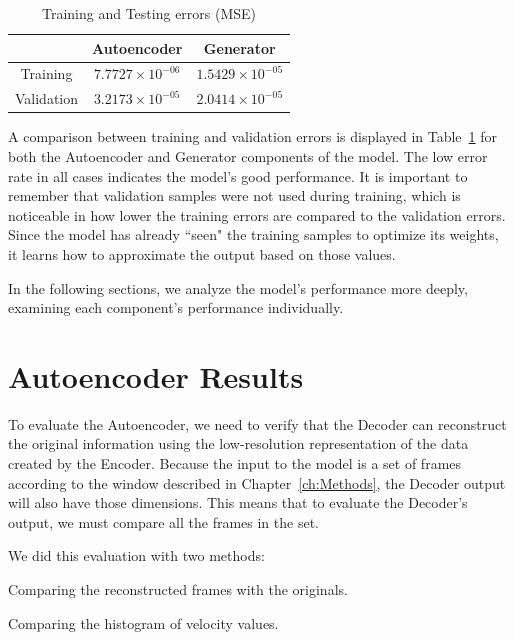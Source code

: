 \begin{table}[h]
    \caption{Training and Testing errors (MSE)}
    \centering
    \begin{tabular}{|c|c|c|}
    \hline
             & Autoencoder & Generator \\ \hline
    Training & $7.7727\times10^{-06}$ & $1.5429\times10^{-05}$ \\ \hline
    Validation  & $3.2173\times10^{-05}$ & $2.0414\times10^{-05}$ \\ \hline
    \end{tabular}
    \label{tab:errors}
\end{table}

A comparison between training and validation errors is displayed in Table~\ref{tab:errors} for both the Autoencoder and Generator components of the model. The low error rate in all cases indicates the model's good performance. It is important to remember that validation samples were not used during training, which is noticeable in how lower the training errors are compared to the validation errors. Since the model has already ``seen" the training samples to optimize its weights, it learns how to approximate the output based on those values.

In the following sections, we analyze the model's performance more deeply, examining each component's performance individually.

\section{Autoencoder Results}
\label{sec:AutoencoderResults}

To evaluate the Autoencoder, we need to verify that the Decoder can reconstruct the original information using the low-resolution representation of the data created by the Encoder. Because the input to the model is a set of frames according to the window described in Chapter~\ref{ch:Methods}, the Decoder output will also have those dimensions. This means that to evaluate the Decoder's output, we must compare all the frames in the set. 

We did this evaluation with two methods:
\begin{packed_enum1}
    \item Comparing the reconstructed frames with the originals. 
    \item Comparing the histogram of velocity values. 
\end{packed_enum1}

